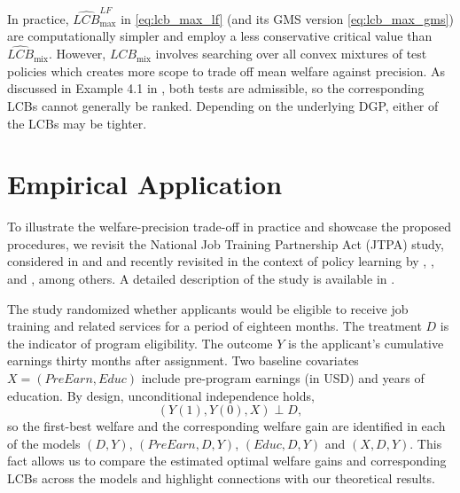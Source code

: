 \documentclass[12pt]{article}
\numberwithin{equation}{section}
\theoremstyle{plain}                         %
\theoremstyle{definition}                  %
\theoremstyle{remark}                      %
\begin{document}
In practice, \(\widehat{LCB}_{\max}^{LF}\) in \eqref{eq:lcb_max_lf} (and its GMS version \eqref{eq:lcb_max_gms}) are computationally simpler and employ a less conservative critical value than \(\widehat{LCB}_{\text{mix}}\). However, \(\widehat{LCB}_{\text{mix}}\)  involves searching over all convex mixtures of test policies  which creates more scope to trade off mean welfare against precision. As discussed in Example 4.1 in \citet{canay2017practical}, both tests are admissible, so the corresponding LCBs cannot generally be ranked. Depending on the underlying DGP, either of the LCBs may be tighter. 




\section{Empirical Application}
\label{sec:jc}

To illustrate the welfare-precision trade-off in practice and showcase the proposed procedures, we revisit the National Job Training Partnership Act (JTPA) study, considered in 
\citet{HeckmanIchimuraTodd} and \citet{AbadieAngrist} and recently revisited in the context of policy learning by
\citet{KitagawaTetenov}, \citet{MbakopTabord}, and \citet{AtheyWager2}, among others.  A detailed description of the study is available in \citet{Bloom1997}.


 The study randomized whether applicants would be eligible to receive job training and related services for a period of eighteen months. The treatment $D$ is the indicator of program eligibility. The outcome $Y$ is the applicant's cumulative earnings thirty months after assignment. Two baseline covariates $X=(PreEarn, Educ)$ include pre-program earnings (in USD) and years of education. By design, unconditional independence holds,
$$
(Y(1), Y(0), X) \perp D, 
$$
so the first-best welfare and the corresponding welfare gain are identified in each of the models $(D,Y)$, $(PreEarn, D,Y)$, $(Educ, D,Y)$ and  $(X,D,Y)$. This fact allows us to compare the estimated optimal welfare gains and corresponding LCBs across the models and highlight connections with our theoretical results.
\end{document}
